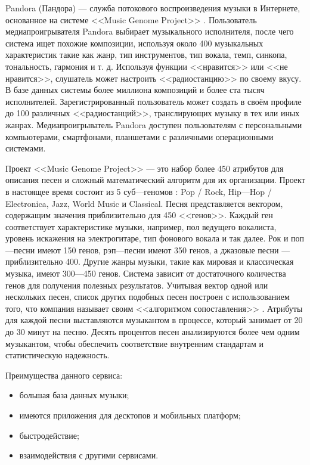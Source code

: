 Pandora (Пандора) — служба потокового воспроизведения музыки в Интернете, основанное на  системе <<Music Genome Project>> \cite{pandora_blog}. Пользователь медиапроигрывателя Pandora выбирает музыкального исполнителя, после чего система ищет похожие композиции, используя около 400 музыкальных характеристик такие как жанр, тип инструментов, тип вокала, темп, синкопа, тональность, гармония и т. д. Используя функции <<нравится>> или <<не нравится>>, слушатель может настроить <<радиостанцию>> по своему вкусу. В базе данных системы более миллиона композиций и более ста тысяч исполнителей\cite{tech_blog}. Зарегистрированный пользователь может создать в своём профиле до 100 различных <<радиостанций>>, транслирующих музыку в тех или иных жанрах. Медиапроигрыватель Pandora доступен пользователям с персональными компьютерами, смартфонами, планшетами с различными операционными системами.

Проект <<Music Genome Project>> — это набор более 450 атрибутов для описания песен и сложный математический алгоритм для их организации. Проект в настоящее время состоит из 5 суб—геномов : Pop / Rock, Hip—Hop / Electronica, Jazz, World Music и Classical. Песня представляется вектором, содержащим значения приблизительно для 450 <<генов>>. Каждый ген соответствует характеристике музыки, например, пол ведущего вокалиста, уровень искажения на электрогитаре, тип фонового вокала и так далее. Рок и поп—песни имеют 150 генов, рэп—песни имеют 350 генов, а джазовые песни — приблизительно 400. Другие жанры музыки, такие как мировая и классическая музыка, имеют 300—450 генов. Система зависит от достаточного количества генов для получения полезных результатов. Учитывая вектор одной или нескольких песен, список других подобных песен построен с использованием того, что компания называет своим <<алгоритмом сопоставления>> \cite{google_patent}. Атрибуты для каждой песни выставляются музыкантом в процессе, который занимает от 20 до 30 минут на песню\cite{interview}. Десять процентов песен анализируются более чем одним музыкантом, чтобы обеспечить соответствие внутренним стандартам и статистическую надежность.

Преимущества данного сервиса:
\begin{itemize}
\item большая база данных музыки;
\item имеются приложения для десктопов и мобильных платформ;
\item быстродействие;
\item взаимодействия с другими сервисами.
\end{itemize}


